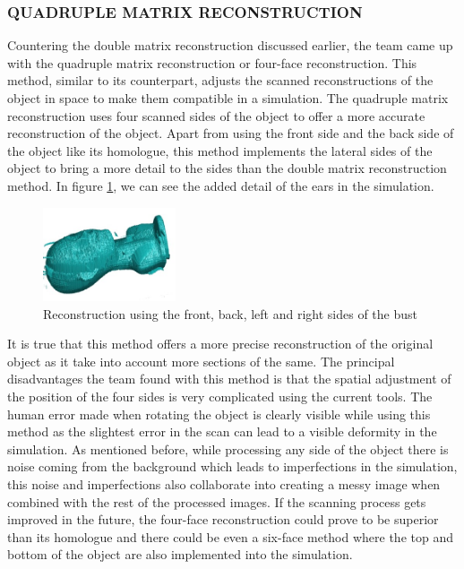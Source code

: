 \subsubsection{QUADRUPLE MATRIX RECONSTRUCTION}
Countering the double matrix reconstruction discussed earlier, the team came up with the quadruple matrix reconstruction or four-face reconstruction. This method, similar to its counterpart, adjusts the scanned reconstructions of the object in space to make them compatible in a simulation. The quadruple matrix reconstruction uses four scanned sides of the object to offer a more accurate reconstruction of the object. Apart from using the front side and the back side of the object like its homologue, this method implements the lateral sides of the object to bring a more detail to the sides than the double matrix reconstruction method. In figure \ref{fig:Quadruple}, we can see the added detail of the ears in the simulation. \\

\begin{figure}[H]
    \centering
    \includegraphics[width=0.35\textwidth]{Figures/FourSideRecons.jpg}
    \caption{Reconstruction using the front, back, left and right sides of the bust}
    \label{fig:Quadruple}
\end{figure}

It is true that this method offers a more precise reconstruction of the original object as it take into account more sections of the same. The principal disadvantages the team found with this method is that the spatial adjustment of the position of the four sides is very complicated using the current tools. The human error made when rotating the object is clearly visible while using this method as the slightest error in the scan can lead to a visible deformity in the simulation. As mentioned before, while processing any side of the object there is noise coming from the background which leads to imperfections in the simulation, this noise and imperfections also collaborate into creating a messy image when combined with the rest of the processed images. If the scanning process gets improved in the future, the four-face reconstruction could prove to be superior than its homologue and there could be even a six-face method where the top and bottom of the object are also implemented into the simulation. \\